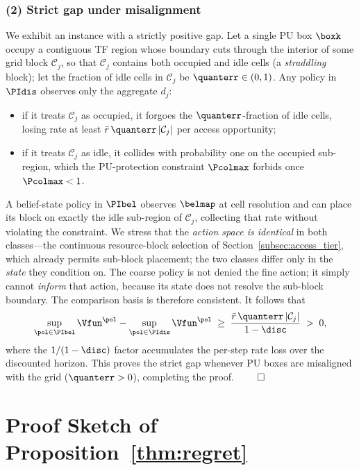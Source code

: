 \subsubsection*{(2) Strict gap under misalignment}
We exhibit an instance with a strictly positive gap. Let a single PU box
$\boxk$ occupy a contiguous TF region whose boundary cuts through the
interior of some grid block $\mathcal{C}_j$, so that $\mathcal{C}_j$ contains
both occupied and idle cells (a \emph{straddling} block); let the
fraction of idle cells in $\mathcal{C}_j$ be $\quanterr\in(0,1)$. Any policy
in $\PIdis$ observes only the aggregate $d_j$:
\begin{itemize}
\item if it treats $\mathcal{C}_j$ as occupied, it forgoes the
$\quanterr$-fraction of idle cells, losing rate at least
$\bar r\,\quanterr\,|\mathcal{C}_j|$ per access opportunity;
\item if it treats $\mathcal{C}_j$ as idle, it collides with probability one
on the occupied sub-region, which the PU-protection constraint
$\Pcolmax$ forbids once $\Pcolmax<1$.
\end{itemize}
A belief-state policy in $\PIbel$ observes $\belmap$ at cell resolution and
can place its block on exactly the idle sub-region of $\mathcal{C}_j$,
collecting that rate without violating the constraint. We stress that the
\emph{action space is identical} in both classes---the continuous
resource-block selection of Section~\ref{subsec:access_tier}, which already
permits sub-block placement; the two classes differ only in the
\emph{state} they condition on. The coarse policy is not denied the fine
action; it simply cannot \emph{inform} that action, because its state does
not resolve the sub-block boundary. The comparison basis is therefore
consistent. It follows that
\begin{equation}
\sup_{\pol\in\PIbel}\Vfun^{\pol}-\sup_{\pol\in\PIdis}\Vfun^{\pol}
\;\ge\;
\frac{\bar r\,\quanterr\,|\mathcal{C}_j|}{1-\disc}\;>\;0,
\label{eq:appB_gap}
\end{equation}
where the $1/(1-\disc)$ factor accumulates the per-step rate loss over the
discounted horizon. This proves the strict gap whenever PU boxes are
misaligned with the grid ($\quanterr>0$), completing the proof. \hfill$\qed$

\section{Proof Sketch of Proposition~\ref{thm:regret}}
\label{sec:appendix_regret}

